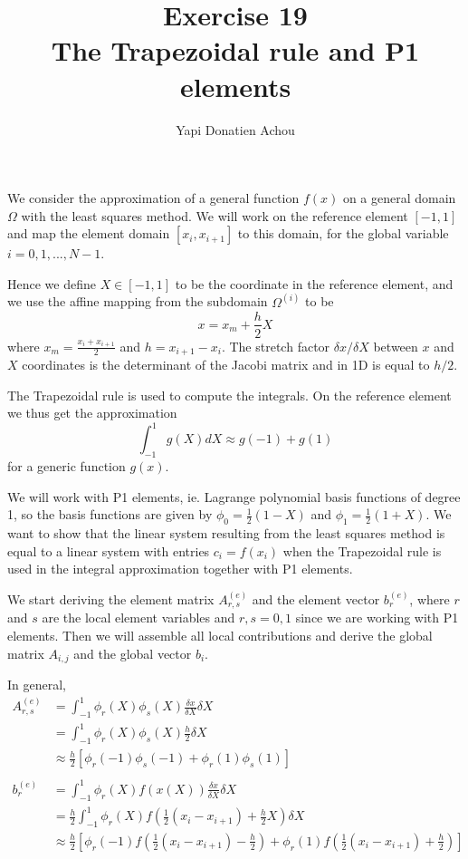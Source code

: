 \documentclass[a4paper,10pt]{article}
\title{Exercise 19\\The Trapezoidal rule and P1 elements}
\author{Yapi Donatien Achou}
\begin{document}
\maketitle
We consider the approximation of a general function $f(x) $ on a general domain $\Omega$ with the least squares method. 
We will work on the reference element $[-1,1]$ and map the element domain $[x_i , x_{i+1}]$ to this domain, 
for the global variable $i=0,1,...,N-1$.

Hence we define $X \in [-1,1]$ to be the coordinate in the reference element, 
and we use the affine mapping from the subdomain $\Omega^{(i)}$ to be
\[
 x = x_m + \frac{h}{2} X 
\] 
where $x_m = \frac{x_i + x_{i+1}}{2}$ and $h = x_{i+1} - x_i$. \newline
The stretch factor $\delta x/\delta X$ between $x$ and $X$ coordinates is the determinant of the Jacobi matrix and 
in 1D is equal to $h/2$.\newline

The Trapezoidal rule is used to compute the integrals. 
On the reference element we thus get the approximation
\[
 \int_{-1}^1 g(X) dX \approx g(-1) +g(1)
\]
for a generic function $g(x)$.

We will work with P1 elements, ie. Lagrange polynomial basis functions of degree 1,
so the basis functions are given by $\phi_0 = \frac{1}{2}(1-X)$ and $\phi_1 = \frac{1}{2}(1+X)$.\newline
\newline We want to show that the linear system resulting from the least squares method 
is equal to a linear system with entries $c_i = f(x_i)$
when the Trapezoidal rule is used in the integral approximation together with P1 elements.\newline

We start deriving the element matrix $A_{r,s}^{(e)}$ and the element vector $b_r^{(e)}$, 
where $r$ and $s$ are the local element variables and $r,s = 0, 1$ since we are working with P1 elements. 
Then we will assemble all local contributions and derive the global matrix $A_{i,j}$ and the global vector $b_i$.\newline

In general,
\begin{align*}
 A_{r,s}^{(e)} &= \int_{-1}^{1} \phi_r(X) \phi_s(X) \frac{\delta x}{\delta X} \delta X \\
 &= \int_{-1}^{1} \phi_r(X) \phi_s(X) \frac{h}{2} \delta X \\
 &\approx \frac{h}{2} [ \phi_r(-1) \phi_s(-1) + \phi_r(1) \phi_s(1) ] \\
 \\ 
 b_r^{(e)} &= \int_{-1}^{1} \phi_r(X) f(x(X)) \frac{\delta x}{\delta X} \delta X \\
 &= \frac{h}{2} \int_{-1}^{1} \phi_r(X) f( \frac{1}{2} (x_i - x_{i+1}) + \frac{h}{2} X) \delta X \\
 &\approx \frac{h}{2} [ \phi_r(-1) f( \frac{1}{2} (x_i - x_{i+1}) - \frac{h}{2}) + \phi_r(1) f(\frac{1}{2} (x_i - x_{i+1}) + \frac{h}{2} ) ] \\ 
 \end{align*}
 
\end{document}
